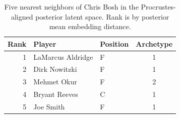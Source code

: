\begin{table}[htbp]
  \centering\small
  \begin{tabular}{rllc}
    \toprule
    Rank & Player & Position & Archetype \\
    \midrule
    1 & LaMarcus Aldridge & F & 1 \\
    2 & Dirk Nowitzki & F & 1 \\
    3 & Mehmet Okur & F & 2 \\
    4 & Bryant Reeves & C & 1 \\
    5 & Joe Smith & F & 1 \\
    \bottomrule
  \end{tabular}
  \caption{Five nearest neighbors of Chris Bosh in the Procrustes-aligned posterior latent space. Rank is by posterior mean embedding distance.}
  \label{tab:Chris_Bosh_neighbors}
\end{table}

